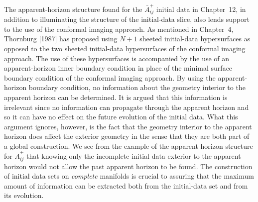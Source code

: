 The apparent-horizon structure found for the $\bar{A}^+_{ij}$ initial data in
Chapter~12, in addition to illuminating the structure of the initial-data slice,
also lends support to the use of the conformal imaging approach.  As mentioned
in Chapter~4,  Thornburg [1987] has proposed using $N+1$ sheeted initial-data
hypersurfaces as opposed to the two sheeted initial-data hypersurfaces of the
conformal imaging approach.  The use of these hypersurfaces is accompanied by
the use of an apparent-horizon inner boundary condition in place of the minimal
surface boundary condition of the conformal imaging approach.  By using the
apparent-horizon boundary condition, no information about the geometry interior
to the apparent horizon can be determined.  It is argued that this information is
irrelevant since no information can propagate through the apparent horizon and
so it can have no effect on the future evolution of the initial data.  What this
argument ignores, however, is the fact that the geometry interior to the
apparent horizon does affect the exterior geometry in the sense that they are
both part of a global construction.  We see from the example of the apparent
horizon structure for $\bar{A}^+_{ij}$ that knowing only the incomplete initial
data exterior to the apparent horizon would not allow the past apparent horizon
to be found.  The construction of initial data sets on {\it complete} manifolds
is crucial to assuring that the maximum amount of information can be extracted
both from the initial-data set and from its evolution.

\vfill
\eject
